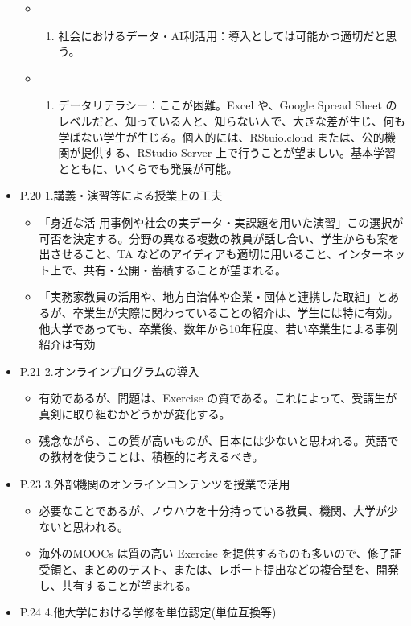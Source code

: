 \documentclass[
]{book}
\providecommand{\tightlist}{%
  \setlength{\itemsep}{0pt}\setlength{\parskip}{0pt}}
\theoremstyle{definition}
\theoremstyle{definition}
\theoremstyle{definition}
\theoremstyle{definition}
\theoremstyle{remark}
\begin{document}
\begin{itemize}
  \begin{itemize}
  \item
    \begin{enumerate}
    \def\labelenumi{\arabic{enumi}.}
    \tightlist
    \item
      社会におけるデータ・AI利活用：導入としては可能かつ適切だと思う。
    \end{enumerate}
  \item
    \begin{enumerate}
    \def\labelenumi{\arabic{enumi}.}
    \setcounter{enumi}{1}
    \tightlist
    \item
      データリテラシー：ここが困難。Excel や、Google Spread Sheet のレベルだと、知っている人と、知らない人で、大きな差が生じ、何も学ばない学生が生じる。個人的には、RStuio.cloud または、公的機関が提供する、RStudio Server 上で行うことが望ましい。基本学習とともに、いくらでも発展が可能。
    \end{enumerate}
  \end{itemize}
\item
  P.20 1.講義・演習等による授業上の工夫

  \begin{itemize}
  \tightlist
  \item
    「身近な活 用事例や社会の実データ・実課題を用いた演習」この選択が可否を決定する。分野の異なる複数の教員が話し合い、学生からも案を出させること、TA などのアイディアも適切に用いること、インターネット上で、共有・公開・蓄積することが望まれる。
  \item
    「実務家教員の活用や、地方自治体や企業・団体と連携した取組」とあるが、卒業生が実際に関わっていることの紹介は、学生には特に有効。他大学であっても、卒業後、数年から10年程度、若い卒業生による事例紹介は有効
  \end{itemize}
\item
  P.21 2.オンラインプログラムの導入

  \begin{itemize}
  \tightlist
  \item
    有効であるが、問題は、Exercise の質である。これによって、受講生が真剣に取り組むかどうかが変化する。
  \item
    残念ながら、この質が高いものが、日本には少ないと思われる。英語での教材を使うことは、積極的に考えるべき。
  \end{itemize}
\item
  P.23 3.外部機関のオンラインコンテンツを授業で活用

  \begin{itemize}
  \tightlist
  \item
    必要なことであるが、ノウハウを十分持っている教員、機関、大学が少ないと思われる。
  \item
    海外のMOOCs は質の高い Exercise を提供するものも多いので、修了証受領と、まとめのテスト、または、レポート提出などの複合型を、開発し、共有することが望まれる。
  \end{itemize}
\item
  P.24 4.他大学における学修を単位認定(単位互換等)


\end{itemize}
\end{document}
